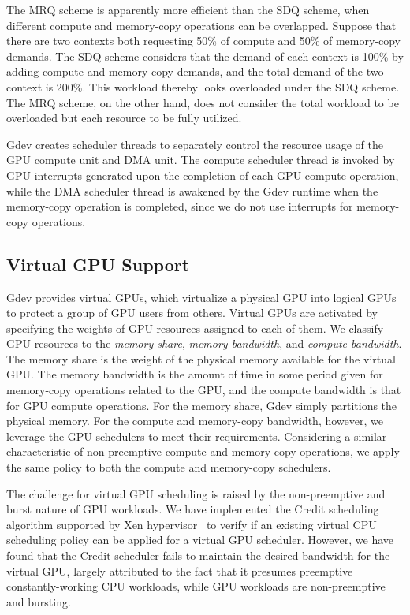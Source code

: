 The MRQ scheme is apparently more efficient than the SDQ scheme, when
different compute and memory-copy operations can be overlapped.
Suppose that there are two contexts both requesting 50\% of compute
and 50\% of memory-copy demands.
The SDQ scheme considers that the demand of each context is 100\% by
adding compute and memory-copy demands, and the total demand of the
two context is 200\%.
This workload thereby looks overloaded under the SDQ scheme.
The MRQ scheme, on the other hand, does not consider the total workload
to be overloaded but each resource to be fully utilized.

Gdev creates scheduler threads to separately control the resource
usage of the GPU compute unit and DMA unit.
The compute scheduler thread is invoked by GPU interrupts generated upon
the completion of each GPU compute operation, while the DMA scheduler
thread is awakened by the Gdev runtime when the memory-copy operation is
completed, since we do not use interrupts for memory-copy operations.

\vspace{-0.25em}
\subsection{Virtual GPU Support}
\label{sec:virtual_gpu}
\vspace{-0.25em}

Gdev provides virtual GPUs, which virtualize a physical GPU into logical
GPUs to protect a group of GPU users from others.
Virtual GPUs are activated by specifying the weights of GPU resources
assigned to each of them.
We classify GPU resources to the \textit{memory share}, \textit{memory
bandwidth}, and \textit{compute bandwidth}.
The memory share is the weight of the physical memory available for the
virtual GPU.
The memory bandwidth is the amount of time in some period given for
memory-copy operations related to the GPU, and the compute bandwidth is
that for GPU compute operations.
For the memory share, Gdev simply partitions the physical memory.
For the compute and memory-copy bandwidth, however, we leverage the GPU 
schedulers to meet their requirements.
Considering a similar characteristic of non-preemptive compute and
memory-copy operations, we apply the same policy to both the compute and
memory-copy schedulers.

The challenge for virtual GPU scheduling is raised by the non-preemptive
and burst nature of GPU workloads.
We have implemented the Credit scheduling algorithm supported by Xen
hypervisor~\cite{Barham_SOSP03} to verify if an existing virtual CPU
scheduling policy can be applied for a virtual GPU scheduler.
However, we have found that the Credit scheduler fails to maintain the
desired bandwidth for the virtual GPU, largely attributed to the fact
that it presumes preemptive constantly-working CPU workloads, while GPU
workloads are non-preemptive and bursting.


